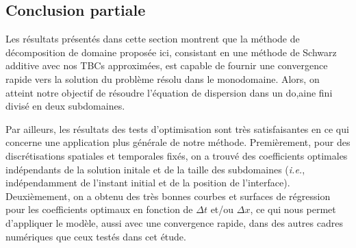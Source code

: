\subsection{Conclusion partiale}
 
\indent Les résultats présentés dans cette section montrent que la méthode de décomposition de domaine proposée ici, consistant en une méthode de Schwarz additive avec nos TBCs approximées, est capable de fournir une convergence rapide vers la solution du problème résolu dans le monodomaine. Alors, on atteint notre objectif de résoudre l'équation de dispersion dans un do,aine fini divisé en deux subdomaines.

\indent Par ailleurs, les résultats des tests d'optimisation sont très satisfaisantes en ce qui concerne une application plus générale de notre méthode. Premièrement, pour des discrétisations spatiales et temporales fixés, on a trouvé des coefficients optimales indépendants de la solution initale et de la taille des subdomaines (\emph{i.e.}, indépendamment de l'instant initial et de la position de l'interface).  Deuxièmement, on a obtenu des très bonnes courbes et surfaces de régression pour les coefficients optimaux en fonction de   $\Delta t$ et/ou $\Delta x$, ce qui nous permet d'appliquer le modèle, aussi avec une convergence rapide, dans des autres cadres numériques que ceux testés dans cet étude.

